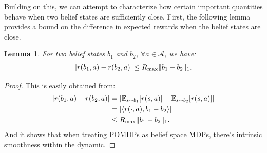 \documentclass[twoside]{article}
\newtheorem{lemma}{Lemma}
\begin{document}
Building on this, we can attempt to characterize how certain important quantities behave when two belief states are sufficiently close. First, the following lemma provides a bound on the difference in expected rewards when the belief states are close.
\begin{lemma}\label{lemma:1}
    For two belief states $b_1$ and $b_2$, $\forall a\in\mathcal{A}$, we have:
    \begin{align}
        |r(b_1,a)-r(b_2,a)|\leq R_{\rm max}\|b_1-b_2\|_1.
    \end{align}
\end{lemma}
\begin{proof}
    This is easily obtained from:
    \begin{align*}
        |r(b_1,a)-r(b_2,a)|=&\ |\mathbb{E}_{s\sim b_1}[r(s,a)]-\mathbb{E}_{s\sim b_2}[r(s,a)]|\\
        =& \ |\langle r(\cdot,a),b_1-b_2\rangle|\\
        \leq&\ R_{\rm max}\|b_1-b_2\|_1.
    \end{align*}
    And it shows that when treating POMDPs as belief space MDPs, there's intrinsic smoothness within the dynamic.
\end{proof}
\end{document}
